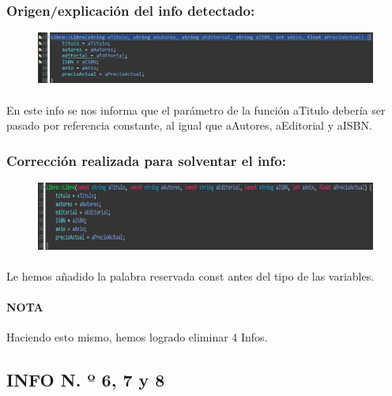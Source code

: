 		\subsubsection{Origen/explicación del info detectado:}
		
			\begin{figure}[H]
				\centering
				\includegraphics[scale=0.55]{img/esteban10.png}
				\label{esteban10}
			\end{figure}
		
			\paragraph{}En este info se nos informa que el parámetro de la función aTitulo debería ser pasado por referencia constante, al igual que aAutores, aEditorial y aISBN.
			
		\subsubsection{ Corrección realizada para solventar el info:}
		
			\begin{figure}[H]
				\centering
				\includegraphics[scale=0.55]{img/esteban11.png}
				\label{esteban11}
			\end{figure}
		
			\paragraph{}Le hemos añadido la palabra reservada const antes del tipo de las variables.
			
			\paragraph{NOTA}Haciendo esto mismo, hemos logrado eliminar 4 Infos.
			
	\subsection{INFO N. º 6, 7 y 8}
	
